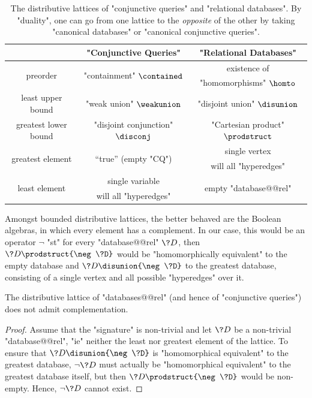 \begin{table}
	\centering
	\begin{tabular}{ccc}
		\toprule
		 & "Conjunctive Queries" & "Relational Databases" \\ \midrule
		\multirow{2}{*}{preorder} & \multirow{2}{*}{"containment" $\contained$} & existence of\\
		& & "homomorphisms" $\homto$ \\
		least upper bound & "weak union" $\weakunion$ & "disjoint union" $\disunion$ \\
		greatest lower bound & "disjoint conjunction" $\disconj$ & "Cartesian product" $\prodstruct$ \\ 
		\multirow{2}{*}{greatest element} & \multirow{2}{*}{``true'' (empty "CQ")} & single vertex \\
		& & will all "hyperedges" \\
		\multirow{2}{*}{least element} & single variable & \multirow{2}{*}{empty "database@@rel"}
		\\
		& will all "hyperedges" & \\ \bottomrule
	\end{tabular}
	\caption{
		\AP\label{tab:distributive-lattices}
		The distributive lattices of "conjunctive queries" and "relational databases".
		By "duality", one can go from one lattice to the \emph{opposite} of the other
		by taking "canonical databases" or "canonical conjunctive queries".}
\end{table}

Amongst bounded distributive lattices, the better behaved are
the Boolean algebras, in which every element has a complement.
In our case, this would be an operator $\neg$ "st" for every "database@@rel" $\?D$,
then $\?D \prodstruct {\neg \?D}$ would be "homomorphically equivalent" to
the empty database and $\?D \disunion {\neg \?D}$ to the greatest database,
consisting of a single vertex and all possible "hyperedges" over it.

\begin{proposition}
	The distributive lattice of "databases@@rel" (and hence of
	"conjunctive queries") does not admit complementation.
\end{proposition}

\begin{proof}
	Assume that the "signature" is non-trivial and let $\?D$ be a non-trivial "database@@rel",
	"ie" neither the least nor greatest element of the lattice.
	To ensure that $\?D \disunion {\neg \?D}$ is "homomorphical equivalent"
	to the greatest database, $\neg \?D$ must actually be "homomorphical equivalent" to 
	the greatest database itself,
	but then $\?D \prodstruct {\neg \?D}$ would be non-empty.
	Hence, $\neg \?D$ cannot exist.
\end{proof}

